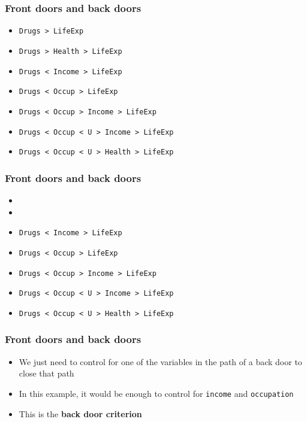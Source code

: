 \documentclass[aspectratio=43]{beamer}
\begin{document}
\begin{frame}
\frametitle{Front doors and back doors}
\centering

\begin{itemize}
  \item \texttt{Drugs > LifeExp}
  \item \texttt{Drugs > Health > LifeExp}
  \item \texttt{Drugs < Income > LifeExp}
  \item \texttt{Drugs < Occup > LifeExp}
  \item \texttt{Drugs < Occup > Income > LifeExp}
  \item \texttt{Drugs < Occup < U > Income > LifeExp}
  \item \texttt{Drugs < Occup < U > Health > LifeExp}
\end{itemize}

\end{frame}

\begin{frame}
\frametitle{Front doors and back doors}
\centering

\begin{itemize}
  \item {}
  \item {}
  \item \texttt{Drugs < Income > LifeExp}
  \item \texttt{Drugs < Occup > LifeExp}
  \item \texttt{Drugs < Occup > Income > LifeExp}
  \item \texttt{Drugs < Occup < U > Income > LifeExp}
  \item \texttt{Drugs < Occup < U > Health > LifeExp}
\end{itemize}

\end{frame}

\begin{frame}
\frametitle{Front doors and back doors}
\centering

\begin{itemize}
  \item We just need to control for one of the variables in the path of a back door to close that path
  \item In this example, it would be enough to control for \texttt{income} and \texttt{occupation}
  \item This is the \textbf{back door criterion}
\end{itemize}

\end{frame}
\end{document}
